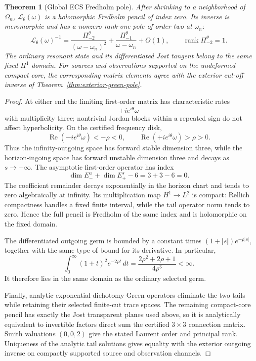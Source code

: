 \documentclass[11pt]{article}
\newtheorem{theorem}{Theorem}[section]
\theoremstyle{remark}
\begin{document}
\begin{theorem}[Global ECS Fredholm pole]
\label{thm:ecs-fredholm}
After shrinking to a neighborhood of \(\Omega_n\),
\(\mathscr L_\theta(\omega)\) is a holomorphic Fredholm pencil of index
zero.  Its inverse is meromorphic and has a nonzero rank-one pole of order
two at \(\omega_n\):
\[
 \boxed{\;
 \mathscr L_\theta(\omega)^{-1}
 =
 \frac{\Pi_{-2}^{\theta}}{(\omega-\omega_n)^2}
 +\frac{\Pi_{-1}^{\theta}}{\omega-\omega_n}
 +O(1),
 \qquad
 \operatorname{rank}\Pi_{-2}^{\theta}=1.
 \;}
\]
The ordinary resonant state and its differentiated Jost tangent belong to
the same fixed \(H^1\) domain.  For sources and observations supported on
the undeformed compact core, the corresponding matrix elements agree
with the exterior cut-off inverse of
Theorem~\ref{thm:exterior-green-pole}.
\end{theorem}

\begin{proof}
At either end the limiting first-order matrix has characteristic rates
\[
 \pm i e^{i\theta}\omega
\]
with multiplicity three; nontrivial Jordan blocks within a repeated sign
do not affect hyperbolicity.  On the certified frequency disk,
\[
 \operatorname{Re}(-i e^{i\theta}\omega)<-\rho<0,
 \qquad
 \operatorname{Re}(+i e^{i\theta}\omega)>\rho>0.
\]
Thus the infinity-outgoing space has forward stable dimension three,
while the horizon-ingoing space has forward unstable dimension three and
decays as \(s\to-\infty\).  The asymptotic first-order operator has index
\[
 \dim E_-^u+\dim E_+^s-6=3+3-6=0.
\]
The coefficient remainder decays exponentially in the horizon chart and
tends to zero algebraically at infinity.  Its multiplication map
\(H^1\to L^2\) is compact: Rellich compactness handles a fixed finite
interval, while the tail operator norm tends to zero.  Hence the full
pencil is Fredholm of the same index and is holomorphic on the fixed
domain.

The differentiated outgoing germ is bounded by a constant times
\((1+|s|)e^{-\rho|s|}\), together with the same type of bound for its
derivative.  In particular,
\[
 \int_0^\infty(1+t)^2e^{-2\rho t}\,dt
 =\frac{2\rho^2+2\rho+1}{4\rho^3}<\infty.
\]
It therefore lies in the same domain as the ordinary selected germ.

Finally, analytic exponential-dichotomy Green operators eliminate the two
tails while retaining their selected finite-cut trace spaces.  The
remaining compact-core pencil has exactly the Jost transparent planes
used above, so it is analytically equivalent to invertible factors direct
sum the certified \(3\times3\) connection matrix.  Smith valuations
\((0,0,2)\) give the stated Laurent order and principal rank.  Uniqueness
of the analytic tail solutions gives equality with the exterior outgoing
inverse on compactly supported source and observation channels.
\end{proof}
\end{document}
